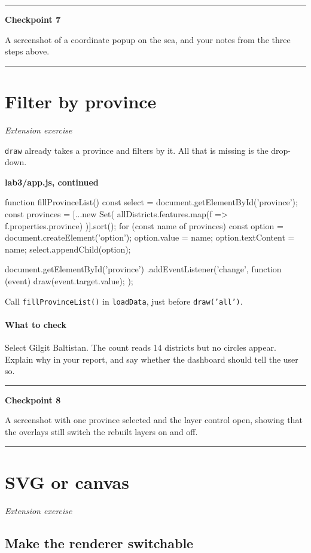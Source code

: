 \documentclass{article}
\newcommand{\cd}[1]{\texttt{#1}}
\newcommand{\codecap}[1]{%
  \par\vspace{.9em}\noindent\textbf{#1}\par\vspace{-.6em}}
\newenvironment{keypoint}[1]
  {\par\vspace{.7em}\noindent\rule{\linewidth}{.6pt}\par\vspace{.15em}
   \noindent\textbf{#1}\par\nobreak\vspace{-.3em}}
  {\par\vspace{.15em}\noindent\rule{\linewidth}{.6pt}\par\vspace{.7em}}
\begin{document}
\begin{keypoint}{Checkpoint 7}
A screenshot of a coordinate popup on the sea, and your notes from the
three steps above.
\end{keypoint}


\section{Filter by province}
\textit{Extension exercise}

\cd{draw} already takes a province and filters by it. All that is
missing is the drop-down.

\codecap{lab3/app.js, continued}
\begin{code}
function fillProvinceList() {
  const select = document.getElementById('province');
  const provinces = [...new Set(
    allDistricts.features.map(f => f.properties.province)
  )].sort();
  for (const name of provinces) {
    const option = document.createElement('option');
    option.value = name;
    option.textContent = name;
    select.appendChild(option);
  }
}

document.getElementById('province')
  .addEventListener('change', function (event) {
    draw(event.target.value);
  });
\end{code}

Call \cd{fillProvinceList()} in \cd{loadData}, just before
\cd{draw('all')}.

\paragraph{What to check}
Select Gilgit Baltistan. The count reads 14 districts but no circles
appear. Explain why in your report, and say whether the dashboard should
tell the user so.

\begin{keypoint}{Checkpoint 8}
A screenshot with one province selected and the layer control open,
showing that the overlays still switch the rebuilt layers on and off.
\end{keypoint}


\section{SVG or canvas}
\textit{Extension exercise}

\subsection{Make the renderer switchable}
\end{document}
